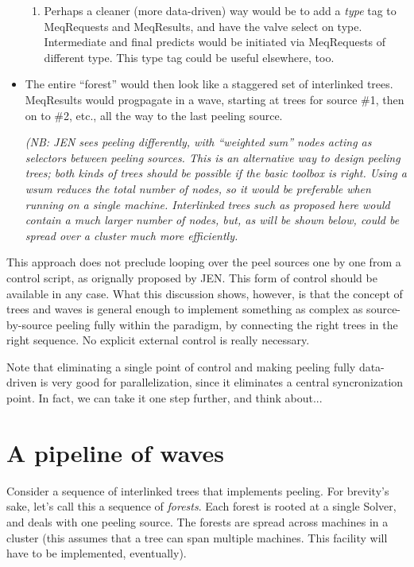 \documentclass[12pt]{article}
\begin{document}
\begin{itemize}
\begin{enumerate}
  \item Perhaps a cleaner (more data-driven) way would be to add a {\em type}
  tag to MeqRequests and MeqResults, and have the valve select on type.
  Intermediate and final predicts would be initiated via MeqRequests of
  different type. This type tag could be useful elsewhere, too.

  \end{enumerate}
  
  \item The entire ``forest'' would then look like a staggered set of
  interlinked trees. MeqResults would progpagate in a wave, starting at trees
  for source \#1, then on to \#2, etc., all the way to the last peeling source.
  
  {\em (NB: JEN sees peeling differently, with ``weighted sum'' nodes acting as
  selectors between peeling sources. This is an alternative way to design
  peeling trees; both kinds of trees should be possible if the basic toolbox is
  right. Using a wsum reduces the total number of nodes, so it would be
  preferable when running on a single machine. Interlinked trees such as
  proposed here would contain a much larger number of nodes, but, as will be
  shown below, could be spread over a cluster much more efficiently.}

  \end{itemize}
  
  This approach does not preclude looping over the peel sources one by one from
  a control script, as orignally proposed by JEN. This form of control should
  be available in any case. What this discussion shows, however, is that the
  concept of trees and waves is general enough to implement something as
  complex as source-by-source peeling fully within the paradigm, by connecting
  the right trees in the right sequence. No explicit external control is really
  necessary.
    
  Note that eliminating a single point of control and making peeling fully
  data-driven is very good for parallelization, since it eliminates a central
  syncronization point. In fact, we can take it one step further, and think
  about...

\section{A pipeline of waves}

  Consider a sequence of interlinked trees that implements peeling. For
  brevity's sake, let's call this a sequence of {\em forests}. Each forest is
  rooted at a single Solver, and deals with one peeling source. The forests are
  spread across machines in a cluster (this assumes that a tree can span
  multiple machines. This facility will have to be implemented, eventually).
\end{document}
